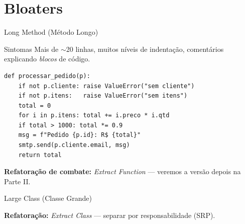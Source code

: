 \documentclass[aspectratio=169]{beamer}
\begin{document}
\section{Bloaters}

\begin{frame}[fragile,shrink=5]{Long Method (Método Longo)}
  \begin{alertblock}{Sintomas}
    Mais de $\sim$20 linhas, muitos níveis de indentação,
    comentários explicando \emph{blocos} de código.
  \end{alertblock}
\begin{lstlisting}
def processar_pedido(p):
    if not p.cliente: raise ValueError("sem cliente")
    if not p.itens:   raise ValueError("sem itens")
    total = 0
    for i in p.itens: total += i.preco * i.qtd
    if total > 1000: total *= 0.9
    msg = f"Pedido {p.id}: R$ {total}"
    smtp.send(p.cliente.email, msg)
    return total
\end{lstlisting}
  \footnotesize\textbf{Refatoração de combate:} \emph{Extract Function} --- veremos a versão depois na Parte II.
\end{frame}

\begin{frame}{Large Class (Classe Grande)}
  \begin{center}
  \end{center}
  \footnotesize\textbf{Refatoração:} \emph{Extract Class} --- separar por responsabilidade (SRP).
\end{frame}
\end{document}
